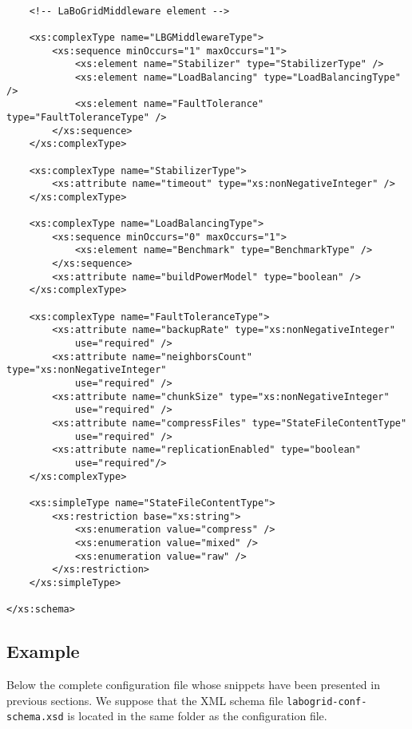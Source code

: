 \begin{Verbatim}[tabsize=2,frame=lines]
	
	<!-- LaBoGridMiddleware element -->
	
	<xs:complexType name="LBGMiddlewareType">
		<xs:sequence minOccurs="1" maxOccurs="1">
			<xs:element name="Stabilizer" type="StabilizerType" />
			<xs:element name="LoadBalancing" type="LoadBalancingType" />
			<xs:element name="FaultTolerance" type="FaultToleranceType" />
		</xs:sequence>
	</xs:complexType>
	
	<xs:complexType name="StabilizerType">
		<xs:attribute name="timeout" type="xs:nonNegativeInteger" />
	</xs:complexType>
	
	<xs:complexType name="LoadBalancingType">
		<xs:sequence minOccurs="0" maxOccurs="1">
			<xs:element name="Benchmark" type="BenchmarkType" />
		</xs:sequence>
		<xs:attribute name="buildPowerModel" type="boolean" />
	</xs:complexType>
	
	<xs:complexType name="FaultToleranceType">
		<xs:attribute name="backupRate" type="xs:nonNegativeInteger"
			use="required" />
		<xs:attribute name="neighborsCount" type="xs:nonNegativeInteger"
			use="required" />
		<xs:attribute name="chunkSize" type="xs:nonNegativeInteger"
			use="required" />
		<xs:attribute name="compressFiles" type="StateFileContentType"
			use="required" />
		<xs:attribute name="replicationEnabled" type="boolean"
			use="required"/>
	</xs:complexType>
	
	<xs:simpleType name="StateFileContentType">
		<xs:restriction base="xs:string">
			<xs:enumeration value="compress" />
			<xs:enumeration value="mixed" />
			<xs:enumeration value="raw" />
		</xs:restriction>
	</xs:simpleType>

</xs:schema>
\end{Verbatim}


\subsection{Example}

Below the complete configuration file whose snippets have been presented in
previous sections. We suppose that the XML schema file
\texttt{labogrid-conf-schema.xsd} is located in the same folder as the
configuration file.

